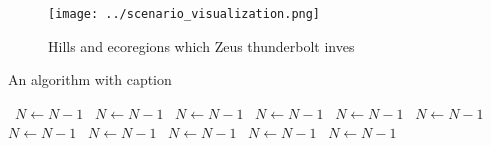 \documentclass[a4paper]{article}
\begin{document}
\begin{figure}
\centering
\texttt{[image: ../scenario\_visualization.png]}
\caption{Hills and ecoregions which Zeus thunderbolt inves
}
\end{figure}
 
\begin{algorithm}
\caption{An algorithm with caption}
\begin{algorithmic}
\    \State $N \gets N - 1$
\    \State $N \gets N - 1$
\    \State $N \gets N - 1$
\    \State $N \gets N - 1$
\    \State $N \gets N - 1$
\    \State $N \gets N - 1$
\    \State $N \gets N - 1$
\    \State $N \gets N - 1$
\    \State $N \gets N - 1$
\    \State $N \gets N - 1$
\    \State $N \gets N - 1$
\EndWhile
\end{algorithmic}
\end{algorithm}
\end{document}
